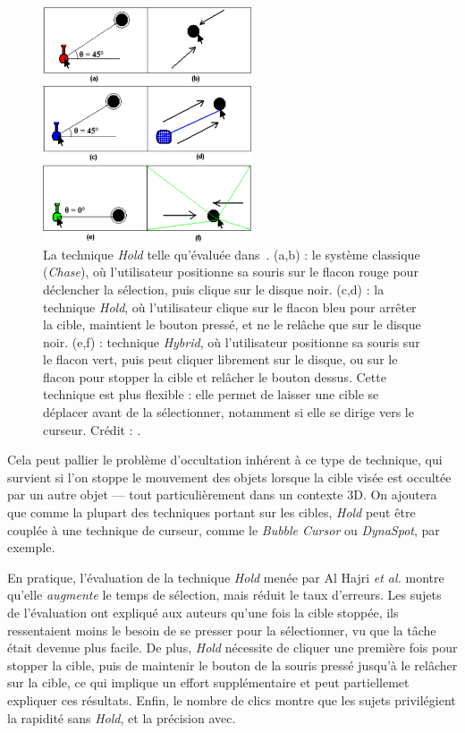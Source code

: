 	\begin{figure}[!htb]
		\centering
		\includegraphics[width=0.55\textwidth]{figures/ch2/hold}
		\caption[La technique \emph{Hold}]{La technique \emph{Hold} telle qu'évaluée dans~\cite{hajri2011moving}. (a,b) : le système classique (\emph{Chase}), où l'utilisateur positionne sa souris sur le flacon rouge pour déclencher la sélection, puis clique sur le disque noir. (c,d) : la technique \emph{Hold}, où l'utilisateur clique sur le flacon bleu pour arrêter la cible, maintient le bouton pressé, et ne le relâche que sur le disque noir. (e,f) : technique \emph{Hybrid}, où l'utilisateur positionne sa souris sur le flacon vert, puis peut cliquer librement sur le disque, ou sur le flacon pour stopper la cible et relâcher le bouton dessus. Cette technique est plus flexible : elle permet de laisser une cible se déplacer avant de la sélectionner, notamment si elle se dirige vers le curseur. Crédit : \cite{hajri2011moving}.}
		\label{fig:hold}
	\end{figure}
	
	Cela peut pallier le problème d'occultation inhérent à ce type de technique, qui survient si l'on stoppe le mouvement des objets lorsque la cible visée est occultée par un autre objet --- tout particulièrement dans un contexte 3D. On ajoutera que comme la plupart des techniques portant sur les cibles, \emph{Hold} peut être couplée à une technique de curseur, comme le \emph{Bubble Cursor} ou \emph{DynaSpot}, par exemple.
	
	En pratique, l'évaluation de la technique \emph{Hold} menée par Al Hajri \emph{et al.} montre qu'elle \emph{augmente} le temps de sélection, mais réduit le taux d'erreurs. Les sujets de l'évaluation ont expliqué aux auteurs qu'une fois la cible stoppée, ils ressentaient moins le besoin de se presser pour la sélectionner, vu que la tâche était devenue plus facile. De plus, \emph{Hold} nécessite de cliquer une première fois pour stopper la cible, puis de maintenir le bouton de la souris pressé jusqu'à le relâcher sur la cible, ce qui implique un effort supplémentaire et peut partiellemet expliquer ces résultats. Enfin, le nombre de clics montre que les sujets privilégient la rapidité sans \emph{Hold}, et la précision avec.
	
